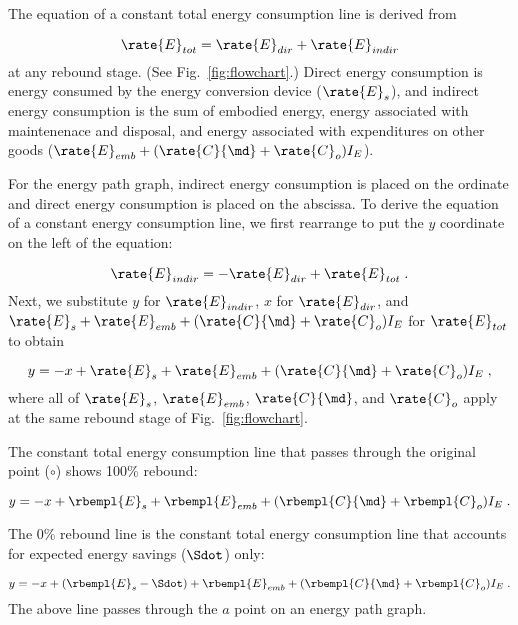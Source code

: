 The equation of a constant total energy consumption line is derived from 

\begin{equation}
  \rate{E}_{tot} = \rate{E}_{dir} + \rate{E}_{indir}
\end{equation}
%
at any rebound stage. (See Fig.~\ref{fig:flowchart}.)
Direct energy consumption is energy consumed by the energy conversion device
($\rate{E}_s$), and 
indirect energy consumption is the sum of embodied energy, 
energy associated with maintenenace and disposal, and energy associated 
with expenditures on other goods
($\rate{E}_{emb} + (\rate{C}{\md} + \rate{C}_o) I_E$).

For the energy path graph, 
indirect energy consumption is placed on the ordinate
and direct energy consumption is placed on the abscissa.
To derive the equation of a constant energy consumption line, 
we first rearrange to put the $y$ coordinate on the left of the equation:

\begin{equation}
  \rate{E}_{indir} = - \rate{E}_{dir} + \rate{E}_{tot} \; .
\end{equation}
%
Next, we substitute $y$ for $\rate{E}_{indir}$,
$x$ for $\rate{E}_{dir}$, and 
$\rate{E}_s + \rate{E}_{emb} + (\rate{C}{\md} + \rate{C}_o) I_E$ for $\rate{E}_{tot}$
to obtain

\begin{equation}
  y = -x + \rate{E}_s + \rate{E}_{emb} + (\rate{C}{\md} + \rate{C}_o) I_E \; ,
\end{equation}
%
where all of $\rate{E}_s$, $\rate{E}_{emb}$, $\rate{C}{\md}$, and $\rate{C}_o$
apply at the same rebound stage of Fig.~\ref{fig:flowchart}.

The constant total energy consumption line 
that passes through the original point ($\circ$)
shows 100\% rebound:

\begin{equation}
  y = -x + \rbempl{E}_s + \rbempl{E}_{emb} + (\rbempl{C}{\md} + \rbempl{C}_o) I_E \; .
\end{equation}

The 0\% rebound line is the constant total energy consumption line 
that accounts for expected energy savings ($\Sdot$) only:

\begin{equation}
  y = -x + (\rbempl{E}_s - \Sdot)
          + \rbempl{E}_{emb} + (\rbempl{C}{\md} + \rbempl{C}_o) I_E \; .
\end{equation}
%
The above line passes through the $a$ point on an energy path graph.


